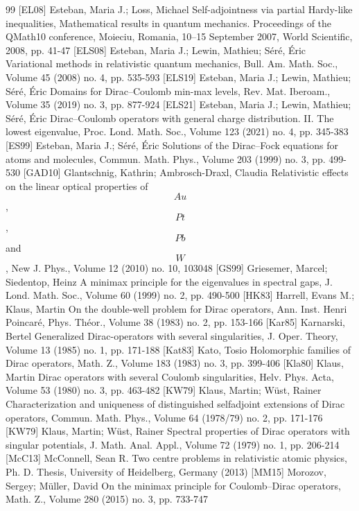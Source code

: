 \documentclass[10pt]{amsart}
\theoremstyle{definition}
\newcommand\1{{\ensuremath {\mathds 1} }}
\begin{document}
\begin{thebibliography}{99}
 [EL08] Esteban, Maria J.; Loss, Michael Self-adjointness via partial Hardy-like inequalities, Mathematical results in quantum mechanics. Proceedings of the QMath10 conference, Moieciu, Romania, 10–15 September 2007, World Scientific, 2008, pp. 41-47
 [ELS08] Esteban, Maria J.; Lewin, Mathieu; Séré, Éric Variational methods in relativistic quantum mechanics, Bull. Am. Math. Soc., Volume 45 (2008) no. 4, pp. 535-593
 [ELS19] Esteban, Maria J.; Lewin, Mathieu; Séré, Éric Domains for Dirac–Coulomb min-max levels, Rev. Mat. Iberoam., Volume 35 (2019) no. 3, pp. 877-924
 [ELS21] Esteban, Maria J.; Lewin, Mathieu; Séré, Éric Dirac–Coulomb operators with general charge distribution. II. The lowest eigenvalue, Proc. Lond. Math. Soc., Volume 123 (2021) no. 4, pp. 345-383
 [ES99] Esteban, Maria J.; Séré, Éric Solutions of the Dirac–Fock equations for atoms and molecules, Commun. Math. Phys., Volume 203 (1999) no. 3, pp. 499-530
 [GAD10] Glantschnig, Kathrin; Ambrosch-Draxl, Claudia Relativistic effects on the linear optical properties of $${Au}$$, $${Pt}$$, $${Pb}$$ and $${W}$$, New J. Phys., Volume 12 (2010) no. 10, 103048
 [GS99] Griesemer, Marcel; Siedentop, Heinz A minimax principle for the eigenvalues in spectral gaps, J. Lond. Math. Soc., Volume 60 (1999) no. 2, pp. 490-500
 [HK83] Harrell, Evans M.; Klaus, Martin On the double-well problem for Dirac operators, Ann. Inst. Henri Poincaré, Phys. Théor., Volume 38 (1983) no. 2, pp. 153-166
 [Kar85] Karnarski, Bertel Generalized Dirac-operators with several singularities, J. Oper. Theory, Volume 13 (1985) no. 1, pp. 171-188
 [Kat83] Kato, Tosio Holomorphic families of Dirac operators, Math. Z., Volume 183 (1983) no. 3, pp. 399-406
 [Kla80] Klaus, Martin Dirac operators with several Coulomb singularities, Helv. Phys. Acta, Volume 53 (1980) no. 3, pp. 463-482
 [KW79] Klaus, Martin; Wüst, Rainer Characterization and uniqueness of distinguished selfadjoint extensions of Dirac operators, Commun. Math. Phys., Volume 64 (1978/79) no. 2, pp. 171-176
 [KW79] Klaus, Martin; Wüst, Rainer Spectral properties of Dirac operators with singular potentials, J. Math. Anal. Appl., Volume 72 (1979) no. 1, pp. 206-214
 [McC13] McConnell, Sean R. Two centre problems in relativistic atomic physics, Ph. D. Thesis, University of Heidelberg, Germany (2013)
 [MM15] Morozov, Sergey; Müller, David On the minimax principle for Coulomb–Dirac operators, Math. Z., Volume 280 (2015) no. 3, pp. 733-747

\end{thebibliography}
\end{document}
